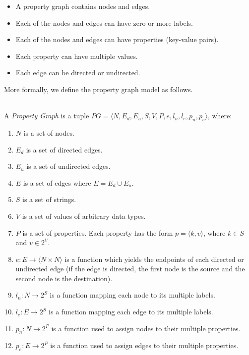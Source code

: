 \documentclass[runningheads]{llncs}
\begin{document}
\begin{itemize}
    \item A property graph contains nodes and edges.
    \item Each of the nodes and edges can have zero or more labels.
    \item Each of the nodes and edges can have properties (key-value pairs).
    \item Each property can have multiple values.
    \item Each edge can be directed or undirected.
\end{itemize}
More formally, we define the property graph model as follows.

\begin{defi}
\leavevmode \vspace{1mm} \\
A \emph{Property Graph} is a tuple
$PG = \langle N, E_d, E_u, S, V, P, e, l_n, l_e, p_n, p_e\rangle$, where:
\begin{enumerate}
    \item $N$ is a set of nodes.
    \item $E_d$ is a set of directed edges.
    \item $E_u$ is a set of undirected edges.
    \item $E$ is a set of edges where $E = E_d \cup E_u$.
    \item $S$ is a set of strings.
    \item $V$ is a set of values of arbitrary data types.
    \item $P$ is a set of properties. Each property has the form $p = \langle k,v \rangle$, where $k \in S$ and $v \in 2^V$.
    \item $e: E \to \langle N \times N \rangle$ is a function which yields the endpoints of each directed or undirected edge (if the edge is directed, the first node is the source and the second node is the destination).
    \item $l_n : N \to 2^S$ is a function mapping each node to its multiple labels.
    \item $l_e : E \to 2^S$ is a function mapping each edge to its multiple labels.
    \item $p_n : N \to 2^P$ is a function used to assign nodes to their multiple properties.
    \item $p_e : E \to 2^P$ is a function used to assign edges to their multiple properties.
\end{enumerate}
\end{defi}
\end{document}
